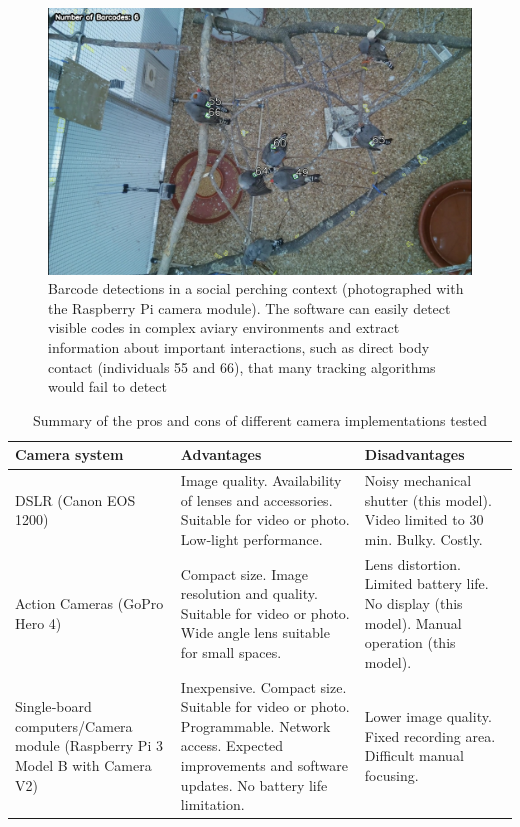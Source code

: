 \documentclass[11pt,a4paper,twoside]{book}
\begin{document}
\begin{doublespace}
\begin{figure}[!htb]
    \centering
    \includegraphics{Graving_IMPRS_Thesis/figures/bird_figure_4.jpg}
    \caption{Barcode detections in a social perching context (photographed with the Raspberry Pi camera module). The software can easily detect visible codes in complex aviary environments and extract information about important interactions, such as direct body contact (individuals 55 and 66), that many tracking algorithms would fail to detect
}
    \label{fig:bird_figure_4}
\end{figure}
\begin{table}[!htb]
\caption{Summary of the pros and cons of different camera implementations tested}
    \begin{tabular}{| m{} | m{} | m{} |}
    \hline
         \textbf{Camera system} & \textbf{Advantages} & \textbf{Disadvantages} \\ \hline
         DSLR (Canon EOS 1200)	& Image quality. Availability of lenses and accessories. Suitable for video or photo. Low‐light performance.	& Noisy mechanical shutter (this model). Video limited to 30 min. Bulky. Costly. \\ \hline
         Action Cameras (GoPro Hero 4)	& Compact size. Image resolution and quality. Suitable for video or photo. Wide angle lens suitable for small spaces.	& Lens distortion. Limited battery life. No display (this model). Manual operation (this model). \\ \hline
         Single‐board computers/Camera module (Raspberry Pi 3 Model B with Camera V2)	&
         Inexpensive. Compact size. Suitable for video or photo. Programmable. Network access. Expected improvements and software updates. No battery life limitation.	& Lower image quality. Fixed recording area. Difficult manual focusing. \\
         \hline
    \end{tabular}
\label{table:bird_table}
\end{table}


\end{doublespace}
\end{document}

